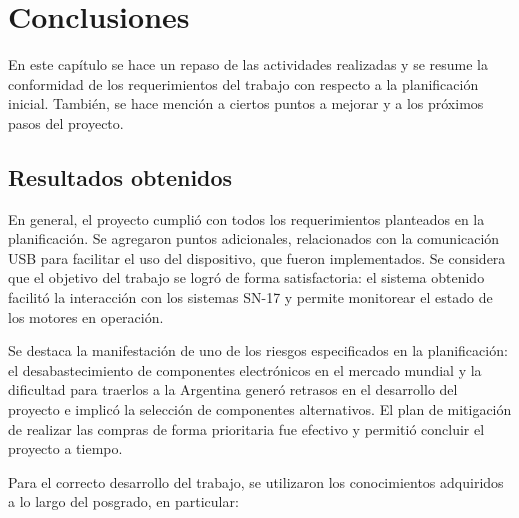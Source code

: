 
\chapter{Conclusiones} %

\label{Chapter5} %




En este capítulo se hace un repaso de las actividades realizadas y se resume la conformidad de los requerimientos del trabajo con respecto a la planificación inicial. También, se hace mención a ciertos puntos a mejorar y a los próximos pasos del proyecto.

\section{Resultados obtenidos}

En general, el proyecto cumplió con todos los requerimientos planteados en la planificación. Se agregaron puntos adicionales, relacionados con la comunicación USB para facilitar el uso del dispositivo, que fueron implementados. Se considera que el objetivo del trabajo se logró de forma satisfactoria: el sistema obtenido facilitó la interacción con los sistemas SN-17 y permite monitorear el estado de los motores en operación.

Se destaca la manifestación de uno de los riesgos especificados en la planificación: el desabastecimiento de componentes electrónicos en el mercado mundial y la dificultad para traerlos a la Argentina generó retrasos en el desarrollo del proyecto e implicó la selección de componentes alternativos. El plan de mitigación de realizar las compras de forma prioritaria fue efectivo y permitió concluir el proyecto a tiempo.

Para el correcto desarrollo del trabajo, se utilizaron los conocimientos adquiridos a lo largo del posgrado, en particular:

